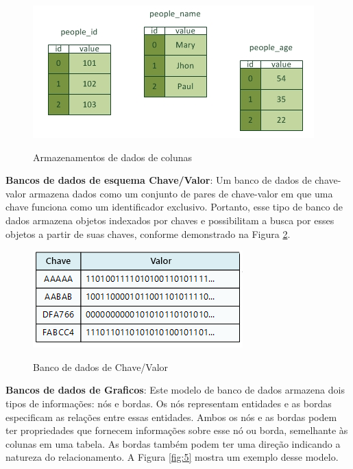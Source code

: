 \begin{compactitem}
\begin{figure}[H]
  \setlength{\abovecaptionskip}{0pt}
  \setlength{\belowcaptionskip}{0pt}
  \caption[Banco de dados de colunas]{Armazenamentos de dados de colunas}
  \centering
  \includegraphics[width=.65\textwidth]{imagem/NoSQL_Column.png}
  \captionsetup{justification=centering}
  \label{fig:3}
\end{figure}
    
\item \textbf{Bancos de dados de esquema Chave/Valor}: Um banco de dados de chave-valor armazena dados como um conjunto de pares de chave-valor em que uma chave funciona como um identificador exclusivo.\cite{amazon} Portanto, esse tipo de banco de dados  armazena objetos indexados por chaves e possibilitam a busca por esses objetos a partir de suas chaves, conforme demonstrado na Figura \ref{fig:4}.

\begin{figure}[H]
  \setlength{\abovecaptionskip}{0pt}
  \setlength{\belowcaptionskip}{0pt}
  \caption[Banco de dados de Chave/Valor]{Banco de dados de Chave/Valor}
  \centering
  \includegraphics[width=.65\textwidth]{imagem/NoSQL_Key_Value.png}
  \captionsetup{justification=centering}
  \label{fig:4}
\end{figure}

\item \textbf{Bancos de dados de Graficos}: Este modelo de banco de dados armazena dois tipos de informações: nós e bordas. Os nós representam entidades e as bordas especificam as relações entre essas entidades. Ambos os nós e as bordas podem ter propriedades que fornecem informações sobre esse nó ou borda, semelhante às colunas em uma tabela. As bordas também podem ter uma direção indicando a natureza do relacionamento. A Figura \ref{fig:5} mostra um exemplo desse modelo. 


\end{compactitem}
